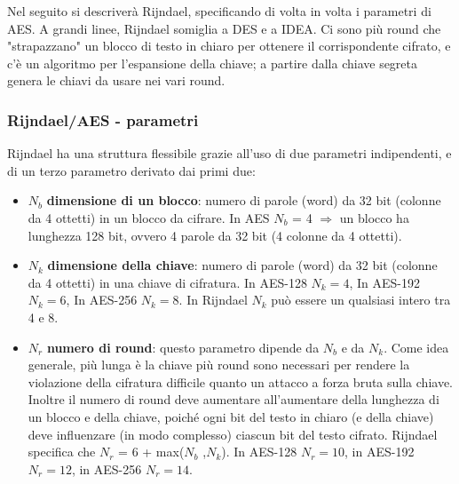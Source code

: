 Nel seguito si descriverà Rijndael, specificando di volta in volta i parametri di AES. A grandi linee, Rijndael somiglia a DES e a IDEA. Ci sono più round che "strapazzano" un blocco di testo in chiaro per ottenere il corrispondente cifrato, e c'è un algoritmo per l'espansione della chiave; a partire dalla chiave segreta genera le chiavi da usare nei vari round.

\subsubsection{Rijndael/AES - parametri}
Rijndael ha una struttura flessibile grazie all'uso di due parametri indipendenti, e di un terzo parametro derivato dai primi due:
\begin{itemize}
  \item $N_{b}$ \textbf{dimensione di un blocco}: numero di parole (word) da 32 bit (colonne da 4 ottetti) in un blocco da cifrare. In AES $N_{b}$ = 4 $\Rightarrow$ un blocco ha lunghezza 128 bit, ovvero 4 parole da 32 bit (4 colonne da 4 ottetti).
  \item $N_{k}$ \textbf{dimensione della chiave}: numero di parole (word) da 32 bit (colonne da 4 ottetti) in una chiave di cifratura. In AES-128 $N_{k} = 4$, In AES-192 $N_{k} = 6$, In AES-256 $N_{k} = 8$. In Rijndael $N_{k}$ può essere un qualsiasi intero tra 4 e 8.
  \item $N_{r}$ \textbf{numero di round}: questo parametro dipende da $N_{b}$ e da $N_{k}$. Come idea generale, più lunga è la chiave più round sono necessari per rendere la violazione della cifratura difficile quanto un attacco a forza bruta sulla chiave. Inoltre il numero di round deve aumentare all'aumentare della lunghezza di un blocco e della chiave, poiché ogni bit del testo in chiaro (e della chiave) deve influenzare (in modo complesso) ciascun bit del testo cifrato. Rijndael specifica che $N_{r}$ = 6 + max($N_{b}$ ,$N_{k}$). In AES-128 $N_{r} = 10$, in AES-192 $N_{r} = 12$, in AES-256 $N_{r} = 14$.
\end{itemize}
  

